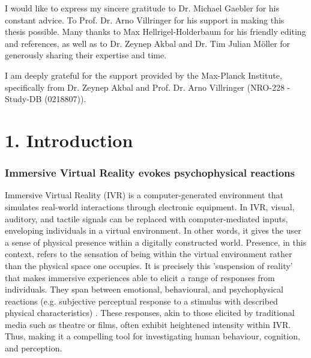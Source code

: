 \documentclass[12pt,oneside,openright]{report}
\begin{document}
\begin{adjustwidth}{1cm}{1cm}

I would like to express my sincere gratitude to Dr. Michael Gaebler for his constant advice.  To Prof. Dr. Arno Villringer for his support in making this thesis possible. Many thanks to Max Hellrigel-Holderbaum for his friendly editing and references, as well as to Dr. Zeynep Akbal and Dr. Tim Julian Möller for generously sharing their expertise and time.

I am deeply grateful for the support provided by the Max-Planck Institute, specifically from Dr. Zeynep Akbal and Prof. Dr. Arno Villringer (NRO-228 - Study-DB (0218807)).
    
\end{adjustwidth}

\clearpage

\section*{1. Introduction}
\subsubsection*{Immersive Virtual Reality evokes psychophysical reactions}

Immersive Virtual Reality (IVR) is a computer-generated environment that simulates real-world interactions through electronic equipment. In IVR, visual, auditory, and tactile signals can be replaced with computer-mediated inputs, enveloping individuals in a virtual environment. In other words, it gives the user a sense of physical presence within a digitally constructed world. Presence, in this context, refers to the sensation of being within the virtual environment rather than the physical space one occupies. It is precisely this 'suspension of reality' that makes immersive experiences able to elicit a range of responses from individuals. They span between emotional, behavioural, and psychophysical reactions (e.g. subjective perceptual response to a stimulus with described physical characteristics) \parencite{SanchezVives2005FromPT}. These responses, akin to those elicited by traditional media such as theatre or films, often exhibit heightened intensity within IVR. Thus, making it a compelling tool for investigating human behaviour, cognition, and perception. 
\end{document}
